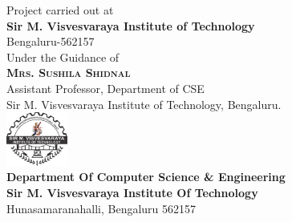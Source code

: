 \begin{titlepage}
	\large{Project carried out at\\
		\textbf{Sir M. Visvesvaraya Institute of Technology}
		\\Bengaluru-562157
	}\\[10pt]
	\large{Under the Guidance of\\
		\textbf{\textsc{\large Mrs. Sushila Shidnal }}\\
		Assistant Professor, Department of CSE\\
		Sir M. Visvesvaraya Institute of Technology, Bengaluru.
	}\\[10pt]
	\includegraphics[width=0.15\textwidth]{images/mvit.png}\\[10pt] 
	\large{
		\textbf{Department Of Computer Science \& Engineering}\\
		\textbf{Sir M. Visvesvaraya Institute Of Technology}\\
		Hunasamaranahalli, Bengaluru 562157\\
	}

\end{titlepage}

